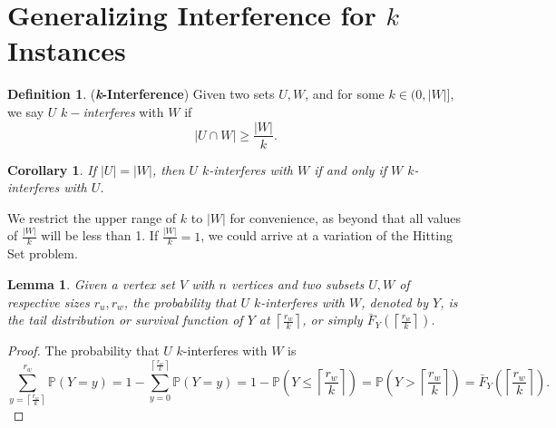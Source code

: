 \documentclass[10pt]{extarticle}
\newtheorem{lemma}[theorem]{Lemma}
\newtheorem{corollary}[theorem]{Corollary}
\theoremstyle{definition}
\newtheorem{definition}[theorem]{Definition}
\begin{document}
\section{Generalizing Interference for $k$ Instances}

\begin{definition}
    (\textbf{\textit{k}-Interference}) Given two sets $U, W$, and for some $k \in (0,|W|]$, we say $U$ $k-$\textit{interferes} with $W$ if 
    \begin{equation}
        |U \cap W| \ge  \frac{|W|}{k}.
    \end{equation}
\end{definition}

\begin{corollary}
\label{collorary:k-int-equals}
    If $|U| = |W|$, then $U$ $k$-interferes with $W$ if and only if $W$ $k$-interferes with $U$.
\end{corollary}

We restrict the upper range of $k$ to $|W|$ for convenience, as beyond that all values of $\frac{|W|}{k}$ will be less than 1. If $\frac{|W|}{k} = 1$, we could arrive at a variation of the Hitting Set problem. 


\begin{lemma}
\label{lemma:k-int-prob}
    Given a vertex set $V$ with $n$ vertices and two subsets $U,W$ of respective sizes $r_u,r_w$, the probability that $U$ $k$-interferes with $W$, denoted by $Y$, is the tail distribution or survival function of $Y$ at $\left\lceil \frac{r_w}{k} \right\rceil$, or simply $\bar{F}_Y\left(\left\lceil \frac{r_w}{k} \right\rceil\right)$.
\end{lemma}
\begin{proof}
    
    The probability that $U$ $k$-interferes with $W$ is 
    \begin{equation}
        \sum_{y = \left\lceil \frac{r_w}{k} \right\rceil}^{r_w} \mathbb{P}(Y=y) = 1 - \sum_{y = 0}^{\left\lceil \frac{r_w}{k} \right\rceil} \mathbb{P}(Y=y) = 1 - \mathbb{P}\left(Y\leq \left\lceil \frac{r_w}{k} \right\rceil\right) = \mathbb{P}\left(Y > \left\lceil \frac{r_w}{k} \right\rceil\right) = \bar{F}_Y\left(\left\lceil \frac{r_w}{k} \right\rceil\right).
    \end{equation}
\end{proof}
\end{document}

